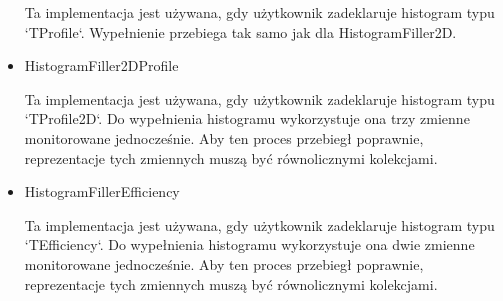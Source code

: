 \begin{itemize}
	Ta implementacja jest używana, gdy użytkownik zadeklaruje histogram typu `TProfile`.
	Wypełnienie przebiega tak samo jak dla HistogramFiller2D.
\item HistogramFiller2DProfile

	Ta implementacja jest używana, gdy użytkownik zadeklaruje histogram typu `TProfile2D`.
	Do wypełnienia histogramu wykorzystuje ona trzy zmienne monitorowane jednocześnie.
	Aby ten proces przebiegł poprawnie, reprezentacje tych zmiennych muszą być równolicznymi kolekcjami.
\item HistogramFillerEfficiency

	Ta implementacja jest używana, gdy użytkownik zadeklaruje histogram typu `TEfficiency`.
	Do wypełnienia histogramu wykorzystuje ona dwie zmienne monitorowane jednocześnie.
	Aby ten proces przebiegł poprawnie, reprezentacje tych zmiennych muszą być równolicznymi kolekcjami.
	
\end{itemize}